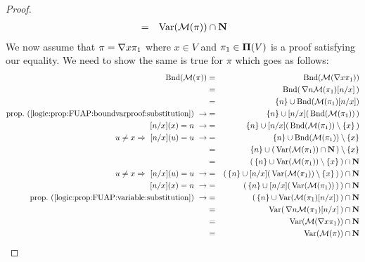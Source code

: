 \begin{proof}
\begin{eqnarray*}
    &=&\mbox{\rm Var}({\cal M}(\pi))\cap\mbox{$\bf N$}\\
    \end{eqnarray*}
We now assume that $\pi=\mbox{$\nabla$} x\pi_{1}$ where $x\in V$ and
$\pi_{1}\in\mbox{${\bf\Pi}(V)$}$ is a proof satisfying our equality. We need to show
the same is true for $\pi$ which goes as follows:
    \begin{eqnarray*}
    \bound({\cal M}(\pi))&=&\bound({\cal M}(\gen x\pi_{1}))\\
    &=&\bound(\,\gen n{\cal M}(\pi_{1})[n/x]\,)\\
    &=&\{n\}\cup\bound({\cal M}(\pi_{1})[n/x])\\
    \mbox{prop.~(\ref{logic:prop:FUAP:boundvarproof:substitution})}\ \rightarrow
    &=&\{n\}\cup[n/x](\,\bound({\cal M}(\pi_{1}))\,)\\
    \mbox{$[n/x](x)=n$}\ \rightarrow
    &=&\{n\}\cup[n/x](\,\bound({\cal M}(\pi_{1}))\setminus\{x\}\,)\\
    u\neq x\Rightarrow\ [n/x](u)=u\ \rightarrow
    &=&\{n\}\cup\bound({\cal M}(\pi_{1}))\setminus\{x\}\\
    &=&\{n\}\cup(\,\var({\cal M}(\pi_{1}))\cap\N\,)\setminus\{x\}\\
    &=&(\,\{n\}\cup\var({\cal M}(\pi_{1}))\setminus\{x\}\,)\cap\N\\
    u\neq x\Rightarrow\ [n/x](u)=u\ \rightarrow
    &=&(\,\{n\}\cup[n/x](\,\var({\cal M}(\pi_{1}))\setminus\{x\}\,)\,)\cap\N\\
    \mbox{$[n/x](x)=n$}\ \rightarrow
    &=&(\,\{n\}\cup[n/x](\,\var({\cal M}(\pi_{1}))\,)\,)\cap\N\\
    \mbox{prop.~(\ref{logic:prop:FUAP:variable:substitution})}\ \rightarrow
    &=&(\,\{n\}\cup\var({\cal M}(\pi_{1})[n/x])\,)\cap\N\\
    &=&\var(\,\gen n{\cal M}(\pi_{1})[n/x]\,)\cap\N\\
    &=&\var({\cal M}(\gen x\pi_{1}))\cap\N\\
    &=&\var({\cal M}(\pi))\cap\N\\
    \end{eqnarray*}
\end{proof}
